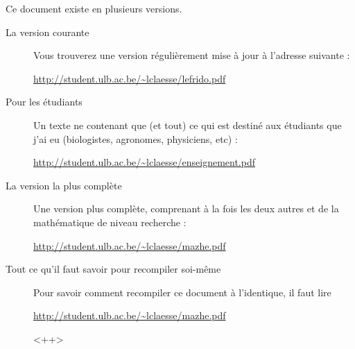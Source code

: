 
\thispagestyle{empty}

Ce document existe en plusieurs versions.
\begin{description}

    \item[La version courante] 

        Vous trouverez une version régulièrement mise à jour à l'adresse suivante :
        \begin{center}
        \url{http://student.ulb.ac.be/~lclaesse/lefrido.pdf}
        \end{center}
        
    \item[Pour les étudiants]

        Un texte ne contenant que (et tout) ce qui est destiné aux étudiants que j'ai eu (biologistes, agronomes, physiciens, etc) :
        \begin{center}
        \url{http://student.ulb.ac.be/~lclaesse/enseignement.pdf}
        \end{center}

    \item[La version la plus complète]

        Une version plus complète, comprenant à la fois les deux autres et de la mathématique de niveau recherche : 
        \begin{center}
        \url{http://student.ulb.ac.be/~lclaesse/mazhe.pdf}
        \end{center}

    \item[Tout ce qu'il faut savoir pour recompiler soi-même]
        Pour savoir comment recompiler ce document à l'identique, il faut lire
        \begin{center}
            \url{http://student.ulb.ac.be/~lclaesse/mazhe.pdf}
        \end{center}
        <++>

\end{description}


\vfill

\clearpage
